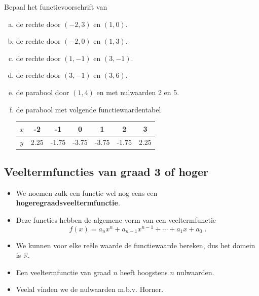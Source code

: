 \documentclass[12pt,twoside,a4paper]{article}
\begin{document}
\begin{oefening}
Bepaal het functievoorschrift van
\begin{enumerate}[(a)]
  \itemsep.8em
  \item de rechte door $(-2, 3)$ en $(1, 0)$.
  \item de rechte door $(-2, 0)$ en $(1, 3)$.
  \item de rechte door $(1, -1)$ en $(3, -1)$.
  \item de rechte door $(3, -1)$ en $(3, 6)$.
  \item de parabool door $(1,4)$ en met nulwaarden 2 en 5.
  \item de parabool met volgende functiewaardentabel
  \begin{center}
    \begin{tabular}{c|cccccc}
    $x$ & -2 & -1 & 0 & 1 & 2 & 3\\
    \hline
    $y$ & 2.25 & -1.75 & -3.75 & -3.75 & -1.75 & 2.25
    \end{tabular}
  \end{center}
\end{enumerate}
\end{oefening}

\subsection{Veeltermfuncties van graad 3 of hoger}

\begin{itemize}
\item We noemen zulk een functie wel nog eens een {\bf hogeregraadsveeltermfunctie}.
\item Deze functies hebben de algemene vorm van een veeltermfunctie
  $$f(x)= a_nx^n + a_{n-1}x^{n-1} + \cdots + a_1x + a_0\;.$$
\item We kunnen voor elke reële waarde de functiewaarde bereken, dus het domein is $\mathbb{R}$.
\item Een veeltermfunctie van graad $n$ heeft hoogstens $n$ nulwaarden.
\item Veelal vinden we de nulwaarden m.b.v. Horner.
\end{itemize}
\end{document}
